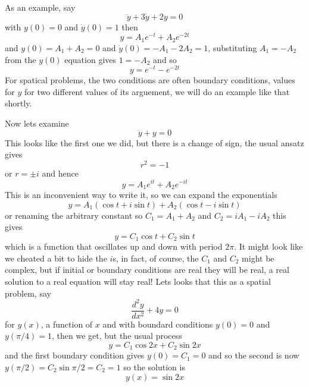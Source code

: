 \documentclass[12pt]{article}
\begin{document}
As an example, say
\begin{equation}
  \ddot{y}+3\dot{y}+2y=0
\end{equation}
with $y(0)=0$ and $\dot{y}(0)=1$ then
\begin{equation}
  y=A_1e^{-t}+A_2e^{-2t}
\end{equation}
and $y(0)=A_1+A_2=0$ and $\dot{y}(0)=-A_1-2A_2=1$, substituting
$A_1=-A_2$ from the $y(0)$ equation gives $1=-A_2$ and so
\begin{equation}
  y=e^{-t}-e^{-2t}
\end{equation}
For spatical problems, the two conditions are often boundary
conditions, values for $y$ for two different values of its arguement,
we will do an example like that shortly.

Now lets examine
\begin{equation}
  \ddot{y}+y=0
\end{equation}
This looks like the first one we did, but there is a change of sign, the usual ansatz gives
\begin{equation}
  r^2=-1
\end{equation}
or $r=\pm i$ and hence
\begin{equation}
  y=A_1e^{it}+A_2e^{-it}
\end{equation}
This is an inconvenient way to write it, so we can expand the exponentials
\begin{equation}
  y=A_1(\cos{t}+i\sin{t})+A_2(\cos{t}-i\sin{t})
\end{equation}
or renaming the arbitrary constant so $C_1=A_1+A_2$ and $C_2=iA_1-iA_2$ this gives
\begin{equation}
  y=C_1\cos{t}+C_2\sin{t}
\end{equation}
which is a function that oscillates up and down with period $2\pi$. It
might look like we cheated a bit to hide the $i$s, in fact, of course,
the $C_1$ and $C_2$ might be complex, but if initial or boundary
conditions are real they will be real, a real solution to a real
equation will stay real! Lets looks that this as a spatial problem, say
\begin{equation}
  \frac{d^2y}{dx^2}+4y=0
\end{equation}
for $y(x)$, a function of $x$ and with boundard conditions $y(0)=0$ and $y(\pi/4)=1$, then we get, but the usual process
\begin{equation}
  y=C_1\cos{2x}+C_2\sin{2x}
\end{equation}
and the first boundary condition gives $y(0)=C_1=0$ and so the second
is now $y(\pi/2)=C_2\sin{\pi/2}=C_2=1$ so the solution is
\begin{equation}
  y(x)=\sin{2x}
\end{equation}
\end{document}
